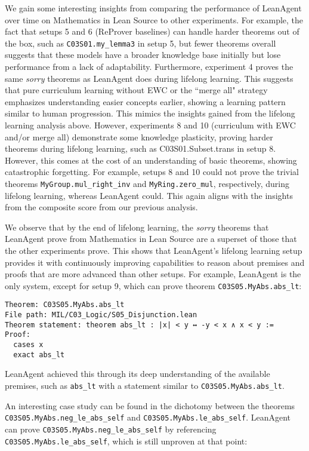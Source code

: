 \documentclass{article} %
\begin{document}
We gain some interesting insights from comparing the performance of LeanAgent over time on Mathematics in Lean Source to other experiments. For example, the fact that setups 5 and 6 (ReProver baselines) can handle harder theorems out of the box, such as \texttt{C03S01.my\_lemma3} in setup 5, but fewer theorems overall suggests that these models have a broader knowledge base initially but lose performance from a lack of adaptability. Furthermore, experiment 4 proves the same \textit{sorry} theorems as LeanAgent does during lifelong learning. This suggests that pure curriculum learning without EWC or the ``merge all" strategy emphasizes understanding easier concepts earlier, showing a learning pattern similar to human progression. This mimics the insights gained from the lifelong learning analysis above. However, experiments 8 and 10 (curriculum with EWC and/or merge all) demonstrate some knowledge plasticity, proving harder theorems during lifelong learning, such as C03S01.Subset.trans in setup 8. However, this comes at the cost of an understanding of basic theorems, showing catastrophic forgetting. For example, setups 8 and 10 could not prove the trivial theorems \texttt{MyGroup.mul\_right\_inv} and \texttt{MyRing.zero\_mul}, respectively, during lifelong learning, whereas LeanAgent could. This again aligns with the insights from the composite score from our previous analysis.

We observe that by the end of lifelong learning, the \textit{sorry} theorems that LeanAgent prove from Mathematics in Lean Source are a superset of those that the other experiments prove. This shows that LeanAgent's lifelong learning setup provides it with continuously improving capabilities to reason about premises and proofs that are more advanced than other setups. For example, LeanAgent is the only system, except for setup 9, which can prove theorem \texttt{C03S05.MyAbs.abs\_lt}:

\begin{verbatim}
Theorem: C03S05.MyAbs.abs_lt
File path: MIL/C03_Logic/S05_Disjunction.lean
Theorem statement: theorem abs_lt : |x| < y ↔ -y < x ∧ x < y :=
Proof:
  cases x
  exact abs_lt
\end{verbatim}

LeanAgent achieved this through its deep understanding of the available premises, such as \texttt{abs\_lt} with a statement similar to \texttt{C03S05.MyAbs.abs\_lt}.

An interesting case study can be found in the dichotomy between the theorems \texttt{C03S05.MyAbs.neg\_le\_abs\_self} and \texttt{C03S05.MyAbs.le\_abs\_self}. LeanAgent can prove \texttt{C03S05.MyAbs.neg\_le\_abs\_self} by referencing \texttt{C03S05.MyAbs.le\_abs\_self}, which is still unproven at that point:
\end{document}
